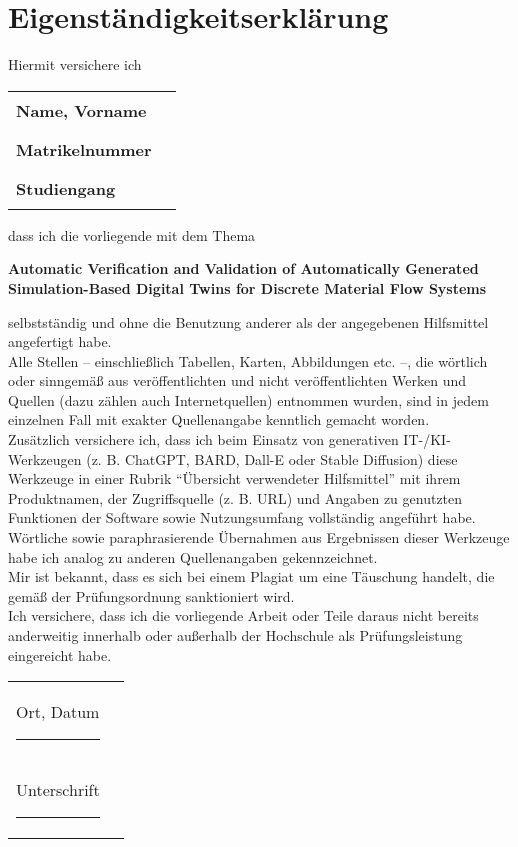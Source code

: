 \chapter*{Eigenständigkeitserklärung}
\thispagestyle{plain}

Hiermit versichere ich

\noindent
\begin{tabular}{ll}
  \textbf{Name, Vorname}  & \rule{8cm}{0.4pt} \\
  \textbf{Matrikelnummer} & \rule{8cm}{0.4pt} \\
  \textbf{Studiengang}    & \rule{8cm}{0.4pt}
\end{tabular}

\noindent
dass ich die vorliegende mit dem Thema

\begin{center}
  \large\bfseries
  Automatic Verification and Validation of Automatically Generated \\
  Simulation-Based Digital Twins for Discrete Material Flow Systems
\end{center}

\noindent
selbstständig und ohne die Benutzung anderer als der angegebenen Hilfsmittel angefertigt habe. \\
Alle Stellen – einschließlich Tabellen, Karten, Abbildungen etc. –, die wörtlich oder sinngemäß aus veröffentlichten und nicht veröffentlichten Werken und Quellen (dazu zählen auch Internetquellen) entnommen wurden, sind in jedem einzelnen Fall mit exakter Quellenangabe kenntlich gemacht worden. \\

\noindent
Zusätzlich versichere ich, dass ich beim Einsatz von generativen IT-/KI-Werkzeugen (z. B. ChatGPT, BARD, Dall-E oder Stable Diffusion) diese Werkzeuge in einer Rubrik \enquote{Übersicht verwendeter Hilfsmittel} mit ihrem Produktnamen, der Zugriffsquelle (z. B. URL) und Angaben zu genutzten Funktionen der Software sowie Nutzungsumfang vollständig angeführt habe. Wörtliche sowie paraphrasierende Übernahmen aus Ergebnissen dieser Werkzeuge habe ich analog zu anderen Quellenangaben gekennzeichnet. \\

\noindent
Mir ist bekannt, dass es sich bei einem Plagiat um eine Täuschung handelt, die gemäß der Prüfungsordnung sanktioniert wird. \\

\noindent
Ich versichere, dass ich die vorliegende Arbeit oder Teile daraus nicht bereits anderweitig innerhalb oder außerhalb der Hochschule als Prüfungsleistung eingereicht habe. \\

\noindent
\begin{tabular}{ll}
  Ort, Datum \rule{7cm}{0.4pt} \\[0.5em]
  Unterschrift \rule{7cm}{0.4pt}
\end{tabular}